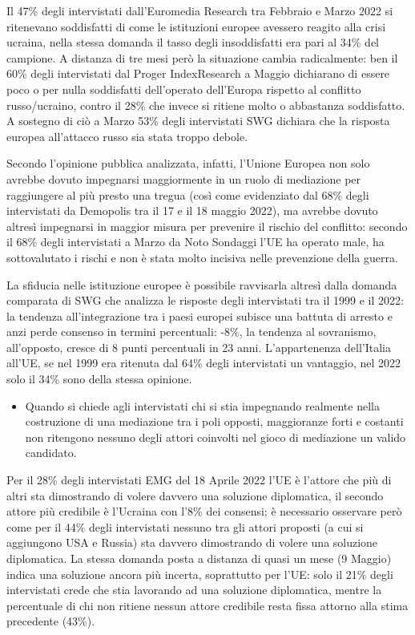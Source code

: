 \documentclass[
]{book}
\providecommand{\tightlist}{%
  \setlength{\itemsep}{0pt}\setlength{\parskip}{0pt}}
\begin{document}
Il 47\% degli intervistati dall'Euromedia Research tra Febbraio e Marzo 2022 si ritenevano soddisfatti di come le istituzioni europee avessero reagito alla crisi ucraina, nella stessa domanda il tasso degli insoddisfatti era pari al 34\% del campione.
A distanza di tre mesi però la situazione cambia radicalmente: ben il 60\% degli intervistati dal Proger IndexResearch a Maggio dichiarano di essere poco o per nulla soddisfatti dell'operato dell'Europa rispetto al conflitto russo/ucraino, contro il 28\% che invece si ritiene molto o abbastanza soddisfatto. A sostegno di ciò a Marzo 53\% degli intervistati SWG dichiara che la risposta europea all'attacco russo sia stata troppo debole.

Secondo l'opinione pubblica analizzata, infatti, l'Unione Europea non solo avrebbe dovuto impegnarsi maggiormente in un ruolo di mediazione per raggiungere al più presto una tregua (così come evidenziato dal 68\% degli intervistati da Demopolis tra il 17 e il 18 maggio 2022), ma avrebbe dovuto altresì impegnarsi in maggior misura per prevenire il rischio del conflitto: secondo il 68\% degli intervistati a Marzo da Noto Sondaggi l'UE ha operato male, ha sottovalutato i rischi e non è stata molto incisiva nelle prevenzione della guerra.

La sfiducia nelle istituzione europee è possibile ravvisarla altresì dalla domanda comparata di SWG che analizza le risposte degli intervistati tra il 1999 e il 2022: la tendenza all'integrazione tra i paesi europei subisce una battuta di arresto e anzi perde consenso in termini percentuali: -8\%, la tendenza al sovranismo, all'opposto, cresce di 8 punti percentuali in 23 anni. L'appartenenza dell'Italia all'UE, se nel 1999 era ritenuta dal 64\% degli intervistati un vantaggio, nel 2022 solo il 34\% sono della stessa opinione.

\begin{itemize}
\tightlist
\item
  Quando si chiede agli intervistati chi si stia impegnando realmente nella costruzione di una mediazione tra i poli opposti, maggioranze forti e costanti non ritengono nessuno degli attori coinvolti nel gioco di mediazione un valido candidato.
\end{itemize}

Per il 28\% degli intervistati EMG del 18 Aprile 2022 l'UE è l'attore che più di altri sta dimostrando di volere davvero una soluzione diplomatica, il secondo attore più credibile è l'Ucraina con l'8\% dei consensi; è necessario osservare però come per il 44\% degli intervistati nessuno tra gli attori proposti (a cui si aggiungono USA e Russia) sta davvero dimostrando di volere una soluzione diplomatica. La stessa domanda posta a distanza di quasi un mese (9 Maggio) indica una soluzione ancora più incerta, soprattutto per l'UE: solo il 21\% degli intervistati crede che stia lavorando ad una soluzione diplomatica, mentre la percentuale di chi non ritiene nessun attore credibile resta fissa attorno alla stima precedente (43\%).
\end{document}
